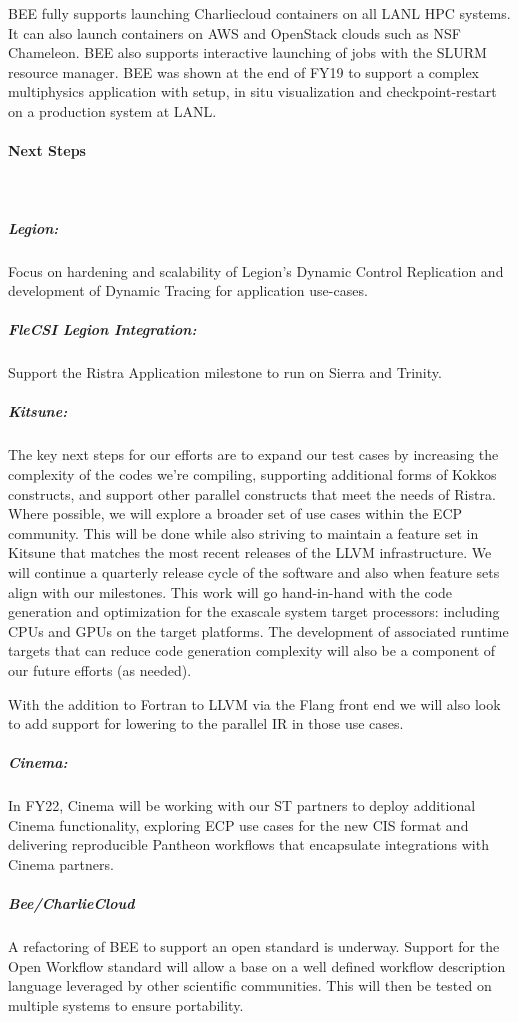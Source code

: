 BEE fully supports launching Charliecloud containers on all LANL HPC systems.
It can also launch containers on AWS and OpenStack clouds such as NSF
Chameleon.  BEE also supports interactive launching of jobs with the SLURM
resource manager. BEE was shown at the end of FY19 to support a complex multiphysics application with setup, in situ visualization and checkpoint-restart on a production system at LANL.

\paragraph{Next Steps} \leavevmode \\

\subparagraph{Legion:} 
Focus on hardening and scalability of Legion's Dynamic Control Replication and development of Dynamic Tracing for application use-cases. 

\subparagraph{FleCSI Legion Integration:} 
Support the Ristra Application milestone to run on Sierra and Trinity.

\subparagraph{Kitsune:}
The key next steps for our efforts are to expand our test cases by
increasing the complexity of the codes we're compiling, supporting
additional forms of Kokkos constructs, and support other parallel
constructs that meet the needs of Ristra.  Where possible, we will
explore a broader set of use cases within the ECP community.  This
will be done while also striving to maintain a feature set in Kitsune
that matches the most recent releases of the LLVM infrastructure. We
will continue a quarterly release cycle of the software and also when
feature sets align with our milestones.  This work will go
hand-in-hand with the code generation and optimization for the
exascale system target processors: including CPUs and GPUs on the
target platforms.  The development of associated runtime targets that
can reduce code generation complexity will also be a component of our
future efforts (as needed).

With the addition to Fortran to LLVM via the Flang front end we will
also look to add support for lowering to the parallel IR in those
use cases.

\subparagraph{Cinema:}
In FY22, Cinema will be working with our ST partners to deploy additional Cinema functionality, exploring ECP use cases for the new CIS format and delivering reproducible Pantheon workflows that encapsulate integrations with Cinema partners.  


\subparagraph{Bee/CharlieCloud}
A refactoring of BEE to support an open standard is underway. Support for the Open Workflow standard will allow a base on a well defined workflow description language leveraged by other scientific communities. This will then be tested on multiple systems to ensure portability.

